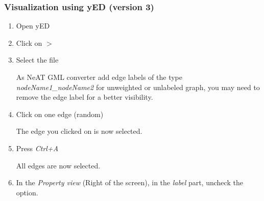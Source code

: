 \subsubsection{Visualization using yED (version 3)}
\begin{enumerate}
 \item Open yED
 \item Click on  $>$ 
 \item Select the file 

As NeAT GML converter add edge labels of the type \textit{nodeName1\_nodeName2} for unweighted or unlabeled graph, you may need to remove the edge label for a better visibility.
 \item Click on one edge (random)
 
 The edge you clicked on is now selected.
 \item Press \textit{Ctrl+A}

All edges are now selected. 
 \item In the \textit{Property view} (Right of the screen), in the \textit{label} part, uncheck the  option.

\end{enumerate}





